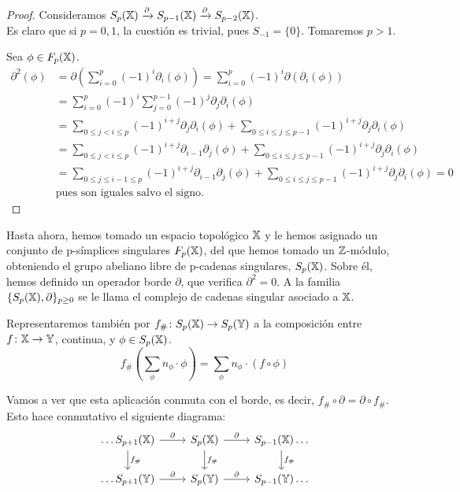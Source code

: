 \begin{proof}
  Consideramos $S_p({\mathbb X}) \xrightarrow{\partial} S_{p-1}({\mathbb X}) \xrightarrow{\partial} S_{p-2}({\mathbb X})$. \\
  Es claro que si $p = 0, 1$, la cuestión es trivial, pues $S_{-1} = \{0\}$. Tomaremos $p > 1$.

  Sea $\phi \in F_{p}({\mathbb X})$.
  \begin{align*}
    \partial^2(\phi) &= \partial(\sum_{i = 0}^p (-1)^i \partial_i(\phi)) = \sum_{i = 0}^p (-1)^i \partial(\partial_i(\phi)) \\
                     &= \sum_{i = 0}^p (-1)^i \sum_{j = 0}^{p-1} (-1)^j \partial_j \partial_i(\phi) \\
                     &= \sum_{0 \leq j < i \leq p} (-1)^{i + j} \partial_j \partial_i(\phi)
                        + \sum_{0 \leq i \leq j \leq p-1} (-1)^{i + j} \partial_j \partial_i(\phi) \\
                     &= \sum_{0 \leq j < i \leq p} (-1)^{i + j} \partial_{i-1} \partial_j(\phi)
                        + \sum_{0 \leq i \leq j \leq p-1} (-1)^{i + j} \partial_j \partial_i(\phi) \\
                     &= \sum_{0 \leq j \leq i-1 \leq p} (-1)^{i + j} \partial_{i-1} \partial_j(\phi)
                        + \sum_{0 \leq i \leq j \leq p-1} (-1)^{i + j} \partial_j \partial_i(\phi) = 0\\
                     &\text{pues son iguales salvo el signo.}
  \end{align*}
\end{proof}

Hasta ahora, hemos tomado un espacio topológico ${\mathbb X}$ y le hemos asignado un conjunto de p-símplices singulares $F_{p}({\mathbb X})$, del que
hemos tomado un $\mathbb{Z}$-módulo, obteniendo el grupo abeliano libre de p-cadenas singulares, $S_p({\mathbb X})$. Sobre él, hemos definido un
operador borde $\partial$, que verifica $\partial^2 = 0$. A la familia $\{S_p({\mathbb X}), \partial\}_{p \geq 0}$ se le llama el complejo de cadenas
singular asociado a ${\mathbb X}$.

Representaremos también por $f_\# \colon S_p({\mathbb X}) \to S_p({\mathbb Y})$ a la composición entre
$f \colon {\mathbb X} \to {\mathbb Y}$, continua, y $\phi \in S_p({\mathbb X})$.
\[ f_\#(\sum_\phi n_\phi \cdot \phi) = \sum_\phi n_\phi \cdot (f \circ \phi) \]

Vamos a ver que esta aplicación conmuta con el borde, es decir, $f_\# \circ \partial = \partial \circ f_\#$. Esto hace conmutativo el siguiente diagrama:
\[
  \begin{tikzcd}
    \dots S_{p+1}(\X) \arrow{r}{\partial} \arrow{d}{f_\#} & S_p(\X) \arrow{r}{\partial} \arrow{d}{f_\#} & S_{p-1}(\X) \arrow{d}{f_\#} \dots \\
    \dots S_{p+1}(\Y) \arrow{r}{\partial}                 & S_p(\Y) \arrow{r}{\partial}                 & S_{p-1}(\Y) \dots
  \end{tikzcd}
\]


